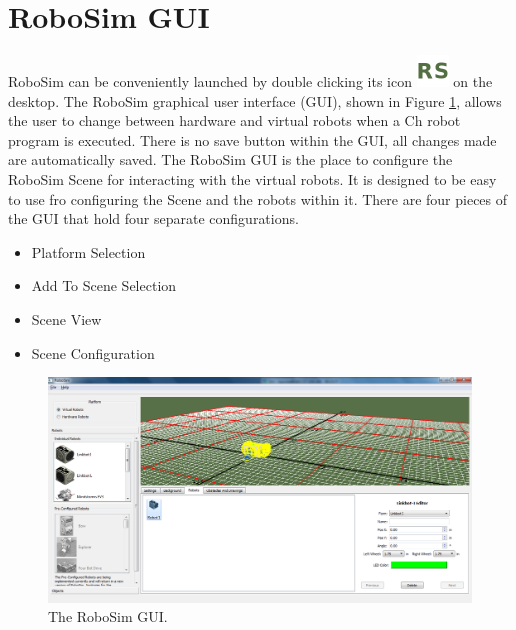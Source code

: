 \documentclass{article}
\begin{document}
\section{RoboSim GUI}
\label{sec:gui}
RoboSim can be conveniently launched by double clicking its icon
\includegraphics[height=24pt]{pictures/robosim} on the desktop.  The RoboSim
graphical user interface (GUI), shown in Figure \ref{fig:gui}, allows the user
to change between hardware and virtual robots when a Ch robot program is
executed.  There is no save button within the GUI, all changes made are
automatically saved.  The RoboSim GUI is the place to configure the RoboSim
Scene for interacting with the virtual robots.  It is designed to be easy to use
fro configuring the Scene and the robots within it.  There are four pieces of
the GUI that hold four separate configurations.
\begin{itemize}
	\item Platform Selection
	\item Add To Scene Selection
	\item Scene View
	\item Scene Configuration
\end{itemize}

\begin{figure}[H]
	\begin{center}
		\includegraphics[width=5in]{pictures/gui}
	\end{center}
	\caption{The RoboSim GUI.}
	\label{fig:gui}
\end{figure}
\end{document}
